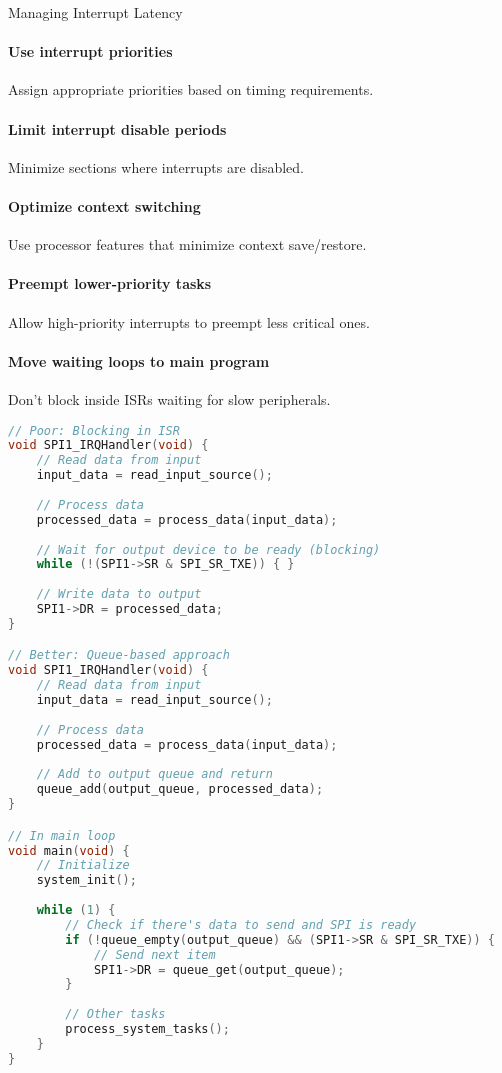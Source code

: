 \begin{KR}{Managing Interrupt Latency}
\paragraph{Use interrupt priorities}
Assign appropriate priorities based on timing requirements.
\paragraph{Limit interrupt disable periods}
Minimize sections where interrupts are disabled.
\paragraph{Optimize context switching}
Use processor features that minimize context save/restore.
\paragraph{Preempt lower-priority tasks}
Allow high-priority interrupts to preempt less critical ones.
\paragraph{Move waiting loops to main program}
Don't block inside ISRs waiting for slow peripherals.

\begin{lstlisting}[language=C, style=basesmol]
// Poor: Blocking in ISR
void SPI1_IRQHandler(void) {
    // Read data from input
    input_data = read_input_source();
    
    // Process data
    processed_data = process_data(input_data);
    
    // Wait for output device to be ready (blocking)
    while (!(SPI1->SR & SPI_SR_TXE)) { }
    
    // Write data to output
    SPI1->DR = processed_data;
}

// Better: Queue-based approach
void SPI1_IRQHandler(void) {
    // Read data from input
    input_data = read_input_source();
    
    // Process data
    processed_data = process_data(input_data);
    
    // Add to output queue and return
    queue_add(output_queue, processed_data);
}

// In main loop
void main(void) {
    // Initialize
    system_init();
    
    while (1) {
        // Check if there's data to send and SPI is ready
        if (!queue_empty(output_queue) && (SPI1->SR & SPI_SR_TXE)) {
            // Send next item
            SPI1->DR = queue_get(output_queue);
        }
        
        // Other tasks
        process_system_tasks();
    }
}
\end{lstlisting}
\end{KR}

